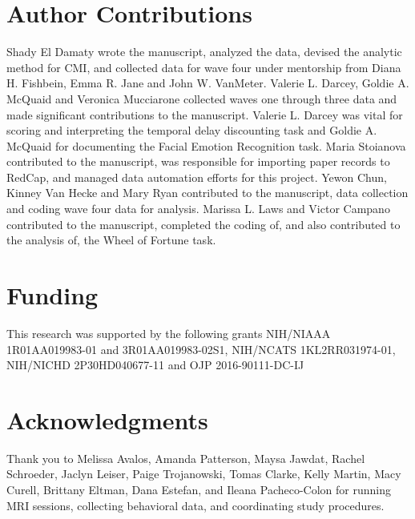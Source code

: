 \documentclass{article}%
\begin{document}
\section*{Author Contributions}
Shady El Damaty wrote the manuscript, analyzed the data, devised the analytic method for CMI, and collected data for wave four under mentorship from Diana H. Fishbein, Emma R. Jane and John W. VanMeter. Valerie L. Darcey, Goldie A. McQuaid and Veronica Mucciarone collected waves one through three data and made significant contributions to the manuscript. Valerie L. Darcey was vital for scoring and interpreting the temporal delay discounting task and Goldie A. McQuaid for documenting the Facial Emotion Recognition task. Maria Stoianova contributed to the manuscript, was responsible for importing paper records to RedCap, and managed data automation efforts for this project. Yewon Chun, Kinney Van Hecke and Mary Ryan contributed to the manuscript, data collection and coding wave four data for analysis. Marissa L. Laws and Victor Campano contributed to the manuscript, completed the coding of, and also contributed to the analysis of, the Wheel of Fortune task.

\section*{Funding}
This research was supported by the following grants NIH/NIAAA 1R01AA019983-01 and 3R01AA019983-02S1, NIH/NCATS 1KL2RR031974-01, 
NIH/NICHD 2P30HD040677-11 and OJP 2016-90111-DC-IJ


\section*{Acknowledgments}
Thank you to Melissa Avalos, Amanda Patterson, Maysa Jawdat, Rachel Schroeder, Jaclyn Leiser, Paige Trojanowski, Tomas Clarke, Kelly Martin, Macy Curell, Brittany Eltman, Dana Estefan, and Ileana Pacheco-Colon for running MRI sessions, collecting behavioral data, and coordinating study procedures. 
\end{document}
